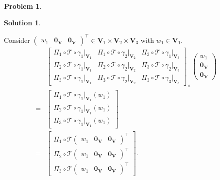 \documentclass{article}
\theoremstyle{definition}
\newtheorem*{prob*}{Problem}
\newtheorem*{sln*}{Solution}
\newcommand{\V}{\mathbf{V}}
\newcommand{\T}{\mathcal{T}}
\begin{document}
\begin{prob*}
\begin{sln*}
\begin{enumerate}
\begin{enumerate}
			Consider $\begin{pmatrix}
			w_1 & \mathbf{0}_\V & \mathbf{0}_\V
			\end{pmatrix}^\top \in \V_1\times\V_2\times\V_3$ with $w_1\in \V_1$.
			\begin{align*}
			&\begin{bmatrix}
			\Pi_1 \circ \T \circ \gamma_1\bigg\vert_{\V_1} & \Pi_1 \circ \T \circ \gamma_2\bigg\vert_{\V_2} & \Pi_3 \circ \T \circ \gamma_1\bigg\vert_{\V_3}\\
			\Pi_2 \circ \T \circ \gamma_1\bigg\vert_{\V_1} & \Pi_2 \circ \T \circ \gamma_2\bigg\vert_{\V_2} & \Pi_3 \circ \T \circ \gamma_2\bigg\vert_{\V_3}\\
			\Pi_3 \circ \T \circ \gamma_1\bigg\vert_{\V_1} & \Pi_3 \circ \T \circ \gamma_2\bigg\vert_{\V_2} & \Pi_3 \circ \T \circ \gamma_3\bigg\vert_{\V_3} 
			\end{bmatrix}_\times
			\begin{pmatrix}
			w_1 \\ \mathbf{0}_\V \\ \mathbf{0}_\V
			\end{pmatrix}\\
			=
			&\begin{bmatrix}
			\Pi_1 \circ \T \circ \gamma_1\bigg\vert_{\V_1}(w_1)\\
			\Pi_2 \circ \T \circ \gamma_1\bigg\vert_{\V_1}(w_1)\\
			\Pi_3 \circ \T \circ \gamma_1\bigg\vert_{\V_1}(w_1)
			\end{bmatrix}\\
			=
			& \begin{bmatrix}
			\Pi_1 \circ \T\begin{pmatrix} w_1 & \mathbf{0}_\V & \mathbf{0}_\V \end{pmatrix}^\top\\
			\Pi_2 \circ \T\begin{pmatrix} w_1 & \mathbf{0}_\V & \mathbf{0}_\V \end{pmatrix}^\top\\
			\Pi_3 \circ \T\begin{pmatrix} w_1 & \mathbf{0}_\V & \mathbf{0}_\V \end{pmatrix}^\top
			\end{bmatrix}.
			\end{align*}
			

\end{enumerate}
\end{enumerate}
\end{sln*}
\end{prob*}
\end{document}
